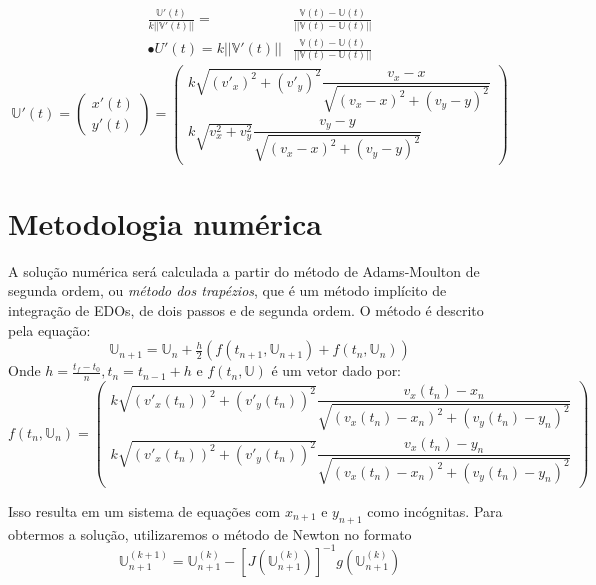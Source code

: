 \documentclass[a4paper,10pt]{article}
\begin{document}
  \begin{align}
   \frac{\mathbb{U}'(t)}{k ||\mathbb{V}'(t)||} = &\frac{\mathbb{V}(t) - \mathbb{U}(t)}{|| \mathbb{V}(t) - \mathbb{U}(t) ||}
   \\
   \mathbb{•}{U}'(t) = k ||\mathbb{V}'(t)|| &\frac{\mathbb{V}(t) - \mathbb{U}(t)}{|| \mathbb{V}(t) - \mathbb{U}(t) ||}
  \end{align}
  \begin{equation}
   \mathbb{U}'(t) = \begin{pmatrix}x'(t) \\ y'(t) \end{pmatrix} = 
   \begin{pmatrix}
   k\sqrt{(v'_{x})^2 + (v'_{y})^2}\dfrac{v_{x} - x}{\sqrt{(v_{x} - x)^2 + (v_{y} - y)^2}}
   \\ 
   k\sqrt{v_{x}^2 + v_{y}^2}\dfrac{v_{y} - y}{\sqrt{(v_{x} - x)^2 + (v_{y} - y)^2}} 
   \end{pmatrix}
  \end{equation}
  
  \section{Metodologia numérica}
  A solução numérica será calculada a partir do método de Adams-Moulton de segunda ordem, ou \emph{método dos trapézios}, que é um método implícito de integração de EDOs, de dois passos e de segunda ordem. O método é descrito pela equação:
  \begin{equation}
   \mathbb{U}_{n+1} = \mathbb{U}_{n} + \tfrac{h}{2}(f(t_{n+1},\mathbb{U}_{n+1}) + f(t_{n},\mathbb{U}_{n}))
  \end{equation}
  Onde $h = \frac{t_f-t_0}{n}, t_n = t_{n-1}+h$ e
  $f(t_{n}, \mathbb{U})$ é um vetor dado por:
  \begin{equation}
    f(t_{n}, \mathbb{U}_{n}) = 
    \begin{pmatrix}
      k\sqrt{(v'_{x}(t_{n}))^2 + (v'_{y}(t_{n}))^2}\dfrac{v_{x}(t_{n}) - x_{n}}{\sqrt{(v_{x}(t_{n}) - x_{n})^2 + (v_{y}(t_{n}) - y_{n})^2}}
      \\ 
      k\sqrt{(v'_{x}(t_{n}))^2 + (v'_{y}(t_{n}))^2}\dfrac{v_{x}(t_{n}) - y_{n}}{\sqrt{(v_{x}(t_{n}) - x_{n})^2 + (v_{y}(t_{n}) - y_{n})^2}} 
   \end{pmatrix}
  \end{equation}
  
  Isso resulta em um sistema de equações com $x_{n+1}$ e $y_{n+1}$ como incógnitas. Para obtermos a solução, utilizaremos o método de Newton no formato
  \begin{equation}
    \mathbb{U}_{n+1}^{(k+1)} = \mathbb{U}_{n+1}^{(k)} - [J(\mathbb{U}_{n+1}^{(k)})]^{-1}g(\mathbb{U}_{n+1}^{(k)})
  \end{equation}
  
\end{document}
